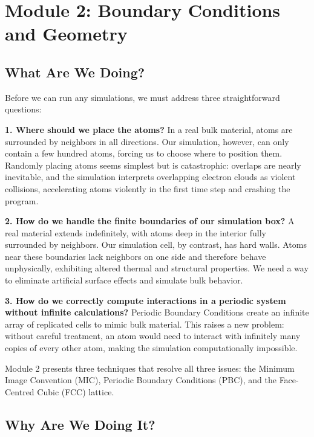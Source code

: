 
\newpage
\section{Module 2: Boundary Conditions and Geometry}

\subsection{What Are We Doing?}

Before we can run any simulations, we must address three straightforward questions:

\textbf{1. Where should we place the atoms?} In a real bulk material, atoms are surrounded by neighbors in all directions. Our simulation, however, can only contain a few hundred atoms, forcing us to choose where to position them. Randomly placing atoms seems simplest but is catastrophic: overlaps are nearly inevitable, and the simulation interprets overlapping electron clouds as violent collisions, accelerating atoms violently in the first time step and crashing the program.

\textbf{2. How do we handle the finite boundaries of our simulation box?} A real material extends indefinitely, with atoms deep in the interior fully surrounded by neighbors. Our simulation cell, by contrast, has hard walls. Atoms near these boundaries lack neighbors on one side and therefore behave unphysically, exhibiting altered thermal and structural properties. We need a way to eliminate artificial surface effects and simulate bulk behavior.

\textbf{3. How do we correctly compute interactions in a periodic system without infinite calculations?} Periodic Boundary Conditions create an infinite array of replicated cells to mimic bulk material. This raises a new problem: without careful treatment, an atom would need to interact with infinitely many copies of every other atom, making the simulation computationally impossible.

Module 2 presents three techniques that resolve all three issues: the Minimum Image Convention (MIC), Periodic Boundary Conditions (PBC), and the Face-Centred Cubic (FCC) lattice.

\subsection{Why Are We Doing It?}


